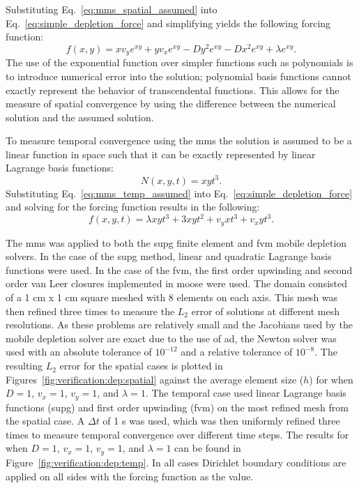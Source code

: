 Substituting Eq.~\ref{eq:mms_spatial_assumed} into Eq.~\ref{eq:simple_depletion_force} and simplifying yields the following forcing function:
\begin{equation}
    f(x,y) = xv_{y}e^{xy} + yv_{x}e^{xy} - Dy^2e^{xy} - Dx^2e^{xy} + \lambda e^{xy}\text{.}
\end{equation}
The use of the exponential function over simpler functions such as polynomials is to introduce numerical error into the solution; polynomial basis functions cannot exactly represent the behavior of transcendental functions. This allows for the measure of spatial convergence by using the difference between the numerical solution and the assumed solution.

To measure temporal convergence using the \acrshort{mms} the solution is assumed to be a linear function in space such that it can be exactly represented by linear Lagrange basis functions:
\begin{equation}\label{eq:mms_temp_assumed}
    N(x,y,t) = xyt^3\text{.}
\end{equation}
Substituting Eq.~\ref{eq:mms_temp_assumed} into Eq.~\ref{eq:simple_depletion_force} and solving for the forcing function results in the following:
\begin{equation}
    f(x,y,t) = \lambda xyt^3 + 3xyt^2 + v_{y}xt^3 + v_{x}yt^3\text{.}
\end{equation}

The \acrshort{mms} was applied to both the \acrshort{supg} finite element and \acrshort{fvm} mobile depletion solvers. In the case of the \acrshort{supg} method, linear and quadratic Lagrange basis functions were used. In the case of the \acrshort{fvm}, the first order upwinding and second order van Leer closures implemented in \acrshort{moose} were used. The domain consisted of a 1 cm x 1 cm square meshed with 8 elements on each axis. This mesh was then refined three times to measure the $L_{2}$ error of solutions at different mesh resolutions. As these problems are relatively small and the Jacobians used by the mobile depletion solver are exact due to the use of \acrshort{ad}, the Newton solver was used with an absolute tolerance of $10^{-12}$ and a relative tolerance of $10^{-8}$. The resulting $L_{2}$ error for the spatial cases is plotted in Figures~\ref{fig:verification:dep:spatial} against the average element size ($h$) for when $D = 1$, $v_{x} = 1$, $v_{y} = 1$, and $\lambda = 1$. The temporal case used linear Lagrange basis functions (\acrshort{supg}) and first order upwinding (\acrshort{fvm}) on the most refined mesh from the spatial case. A $\Delta t$ of 1 s was used, which was then uniformly refined three times to measure temporal convergence over different time steps. The results for when $D = 1$, $v_{x} = 1$, $v_{y} = 1$, and $\lambda = 1$ can be found in Figure~\ref{fig:verification:dep:temp}. In all cases Dirichlet boundary conditions are applied on all sides with the forcing function as the value.

